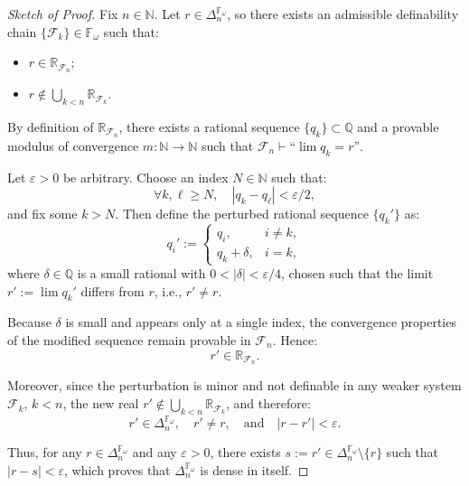 \documentclass[12pt]{article}
\theoremstyle{definition}
\theoremstyle{plain}
\theoremstyle{remark}
\begin{document}
\begin{proof}[Sketch of Proof]
Fix \( n \in \mathbb{N} \). Let \( r \in \Delta_n^{\mathbb{F}_\omega} \), so there exists an admissible definability chain \( \{\mathcal{F}_k\} \in \mathbb{F}_\omega \) such that:
\begin{itemize}
    \item \( r \in \mathbb{R}_{\mathcal{F}_n} \);
    \item \( r \notin \bigcup_{k < n} \mathbb{R}_{\mathcal{F}_k} \).
\end{itemize}

By definition of \( \mathbb{R}_{\mathcal{F}_n} \), there exists a rational sequence \( \{q_k\} \subset \mathbb{Q} \) and a provable modulus of convergence \( m: \mathbb{N} \to \mathbb{N} \) such that \( \mathcal{F}_n \vdash \text{“}\lim q_k = r \text{”} \).

Let \( \varepsilon > 0 \) be arbitrary. Choose an index \( N \in \mathbb{N} \) such that:
\[
\forall k, \ell \geq N,\quad |q_k - q_\ell| < \varepsilon/2,
\]
and fix some \( k > N \). Then define the perturbed rational sequence \( \{q_k'\} \) as:
\[
q_i' := 
\begin{cases}
q_i, & i \neq k, \\
q_k + \delta, & i = k,
\end{cases}
\]
where \( \delta \in \mathbb{Q} \) is a small rational with \( 0 < |\delta| < \varepsilon/4 \), chosen such that the limit \( r' := \lim q_k' \) differs from \( r \), i.e., \( r' \neq r \).

Because \( \delta \) is small and appears only at a single index, the convergence properties of the modified sequence remain provable in \( \mathcal{F}_n \). Hence:
\[
r' \in \mathbb{R}_{\mathcal{F}_n}.
\]

Moreover, since the perturbation is minor and not definable in any weaker system \( \mathcal{F}_k \), \( k < n \), the new real \( r' \notin \bigcup_{k < n} \mathbb{R}_{\mathcal{F}_k} \), and therefore:
\[
r' \in \Delta_n^{\mathbb{F}_\omega}, \quad r' \neq r, \quad \text{and} \quad |r - r'| < \varepsilon.
\]

Thus, for any \( r \in \Delta_n^{\mathbb{F}_\omega} \) and any \( \varepsilon > 0 \), there exists \( s := r' \in \Delta_n^{\mathbb{F}_\omega} \setminus \{r\} \) such that \( |r - s| < \varepsilon \), which proves that \( \Delta_n^{\mathbb{F}_\omega} \) is dense in itself.
\end{proof}
\end{document}
